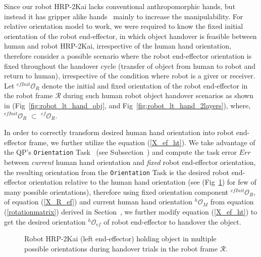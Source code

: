 Since our robot HRP-2Kai lacks conventional anthropomorphic hands, but instead it has gripper alike hands~\cite{kaneko2015humanoid, stasse2019overview} mainly to increase the manipulability. For relative orientation model to work, we were required to know the fixed initial orientation of the robot end-effector, in which object handover is feasible between human and robot HRP-2Kai, irrespective of the human hand orientation, therefore consider a possible  scenario where the robot end-effector orientation is fixed throughout the handover cycle (transfer of object from human to robot and return to human), irrespective of the condition where robot is a giver or receiver. Let ${{}^{efInit}\mathcal{O}_R}$ denote the initial and fixed orientation of the robot end-effector in the robot frame $\mathcal{R}$ during such human robot object handover scenarios as shown in (Fig~\ref{fig:robot_lt_hand_obj}, and Fig~\ref{fig:robot_lt_hand_2layers}), where, ${{}^{efInit}\mathcal{O}_R}$ $\subset$ ${{}^{ef}\mathcal{O}_R}$.




In order to correctly transform desired human hand orientation into robot end-effector frame, we further utilize the equation (\ref{X_ef_ht}). We take advantage of the QP's \texttt{Orientation} Task~\cite{murray2017mathematical, ladder-HRP-2Kai} (see Subsection~) and compute the task error $Err$ between \textit{current} human hand orientation and \textit{fixed} robot end-effector orientation, the resulting orientation from the \texttt{Orientation} Task is the desired robot end-effector orientation relative to the human hand orientation (see (Fig~\ref{fig:robot_lt_orientations}) for few of many possible orientations), therefore using fixed orientation component  ${{}^{efInit}\mathcal{O}_R}$, of equation (\ref{X_R_ef}) and current human hand orientation ${}^{h}\mathcal{O}_M$ from equation (\ref{rotationmatrix}) derived in Section~, we further modify equation (\ref{X_ef_ht}) to get the desired orientation $ {}^{h}\mathcal{O}_{ef} $ of robot end-effector to handover the object.

\begin{figure}[ht]
	\caption{Robot HRP-2Kai (left end-effector) holding object in multiple possible orientations during handover trials in the robot frame $\mathcal{R}$.}
	\label{fig:robot_lt_orientations}
\end{figure} 


